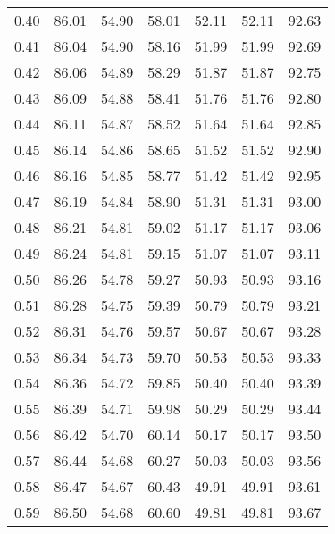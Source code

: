 \begin{tabular}{|c|c|c|c|c|c|c|}
      0.40 &     86.01 &     54.90 &      58.01 &   52.11 &      52.11 &         92.63 \\
      0.41 &     86.04 &     54.90 &      58.16 &   51.99 &      51.99 &         92.69 \\
      0.42 &     86.06 &     54.89 &      58.29 &   51.87 &      51.87 &         92.75 \\
      0.43 &     86.09 &     54.88 &      58.41 &   51.76 &      51.76 &         92.80 \\
      0.44 &     86.11 &     54.87 &      58.52 &   51.64 &      51.64 &         92.85 \\
      0.45 &     86.14 &     54.86 &      58.65 &   51.52 &      51.52 &         92.90 \\
      0.46 &     86.16 &     54.85 &      58.77 &   51.42 &      51.42 &         92.95 \\
      0.47 &     86.19 &     54.84 &      58.90 &   51.31 &      51.31 &         93.00 \\
      0.48 &     86.21 &     54.81 &      59.02 &   51.17 &      51.17 &         93.06 \\
      0.49 &     86.24 &     54.81 &      59.15 &   51.07 &      51.07 &         93.11 \\
      0.50 &     86.26 &     54.78 &      59.27 &   50.93 &      50.93 &         93.16 \\
      0.51 &     86.28 &     54.75 &      59.39 &   50.79 &      50.79 &         93.21 \\
      0.52 &     86.31 &     54.76 &      59.57 &   50.67 &      50.67 &         93.28 \\
      0.53 &     86.34 &     54.73 &      59.70 &   50.53 &      50.53 &         93.33 \\
      0.54 &     86.36 &     54.72 &      59.85 &   50.40 &      50.40 &         93.39 \\
      0.55 &     86.39 &     54.71 &      59.98 &   50.29 &      50.29 &         93.44 \\
      0.56 &     86.42 &     54.70 &      60.14 &   50.17 &      50.17 &         93.50 \\
      0.57 &     86.44 &     54.68 &      60.27 &   50.03 &      50.03 &         93.56 \\
      0.58 &     86.47 &     54.67 &      60.43 &   49.91 &      49.91 &         93.61 \\
      0.59 &     86.50 &     54.68 &      60.60 &   49.81 &      49.81 &         93.67 \\

\end{tabular}
